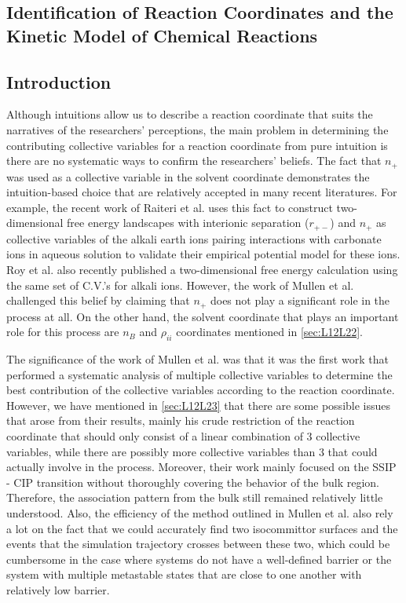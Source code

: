 \begin{spacing}{2.0}
    \chapter{Identification of Reaction Coordinates and the Kinetic Model of Chemical Reactions}
    \label{chap:chapter-msm}

    \section{Introduction}

    Although intuitions allow us to describe a reaction coordinate that suits the narratives of the researchers' perceptions, the main problem in 
    determining the contributing collective variables for a reaction coordinate from pure intuition is there are no systematic ways to confirm the 
    researchers' beliefs. The fact that $n_+$ was used as a collective variable in the solvent coordinate demonstrates the intuition-based choice 
    that are relatively accepted in many recent literatures. For example, the recent work of Raiteri et al. uses this fact to construct 
    two-dimensional free energy landscapes with interionic separation ($r_{+-}$) and $n_+$ as collective variables of the alkali earth ions pairing 
    interactions with carbonate ions in aqueous solution to validate their empirical potential model for these ions. \cite{P-JPhysChemC-2015-v43-Raiteri} 
    Roy et al. also recently published a two-dimensional free energy calculation using the same set of C.V.'s for alkali ions. 
    \cite{P-JPhysChemC-2016-v120-Roy, P-JCTC-2017-v13-Roy} However, the work of Mullen et al. 
    challenged this belief by claiming that $n_+$  does not play a significant role in the process at all. On the other hand, the solvent coordinate 
    that plays an important role for this process are $n_B$ and $\rho_{ii}$ coordinates mentioned in \ref{sec:L12L22}. \cite{P-JCTC-2014-v10-Mullen}

    The significance of the work of Mullen et al. was that it was the first work that performed a systematic analysis of multiple collective variables 
    to determine the best contribution of the collective variables according to the reaction coordinate. However, we have mentioned in \ref{sec:L12L23} 
    that there are some possible issues that arose from their results, mainly his crude restriction of the reaction coordinate that should only 
    consist of a linear combination of 3 collective variables, while there are possibly more collective variables than 3 that could actually involve 
    in the process. Moreover, their work mainly focused on the SSIP - CIP transition without thoroughly covering the behavior of the bulk region. 
    Therefore, the association pattern from the bulk still remained relatively little understood. Also, the efficiency of the method outlined in 
    Mullen et al. also rely a lot on the fact that we could accurately find two isocommittor surfaces and the events that the simulation trajectory 
    crosses between these two, which could be cumbersome in the case where systems do not have a well-defined barrier or the system with multiple 
    metastable states that are close to one another with relatively low barrier.


\end{spacing}
